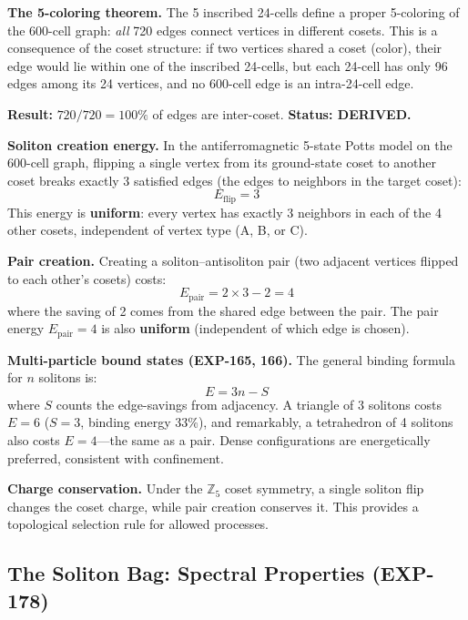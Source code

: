 \documentclass[12pt,a4paper]{article}
\begin{document}
\textbf{The 5-coloring theorem.} The 5 inscribed 24-cells define a proper 5-coloring of the 600-cell graph: \emph{all} 720 edges connect vertices in different cosets. This is a consequence of the coset structure: if two vertices shared a coset (color), their edge would lie within one of the inscribed 24-cells, but each 24-cell has only 96 edges among its 24 vertices, and no 600-cell edge is an intra-24-cell edge.

\textbf{Result:} $720/720 = 100\%$ of edges are inter-coset. \textbf{Status: DERIVED.}

\textbf{Soliton creation energy.} In the antiferromagnetic 5-state Potts model on the 600-cell graph, flipping a single vertex from its ground-state coset to another coset breaks exactly 3 satisfied edges (the edges to neighbors in the target coset):
\begin{equation}
\boxed{E_{\text{flip}} = 3}
\end{equation}
This energy is \textbf{uniform}: every vertex has exactly 3 neighbors in each of the 4 other cosets, independent of vertex type (A, B, or C).

\textbf{Pair creation.} Creating a soliton--antisoliton pair (two adjacent vertices flipped to each other's cosets) costs:
\begin{equation}
E_{\text{pair}} = 2 \times 3 - 2 = 4
\end{equation}
where the saving of 2 comes from the shared edge between the pair. The pair energy $E_{\text{pair}} = 4$ is also \textbf{uniform} (independent of which edge is chosen).

\textbf{Multi-particle bound states (EXP-165, 166).} The general binding formula for $n$ solitons is:
\begin{equation}
E = 3n - S
\end{equation}
where $S$ counts the edge-savings from adjacency. A triangle of 3 solitons costs $E = 6$ ($S = 3$, binding energy 33\%), and remarkably, a tetrahedron of 4 solitons also costs $E = 4$---the same as a pair. Dense configurations are energetically preferred, consistent with confinement.

\textbf{Charge conservation.} Under the $\mathbb{Z}_5$ coset symmetry, a single soliton flip changes the coset charge, while pair creation conserves it. This provides a topological selection rule for allowed processes.

\subsection{The Soliton Bag: Spectral Properties (EXP-178)}
\label{sec:soliton_bag}
\end{document}
